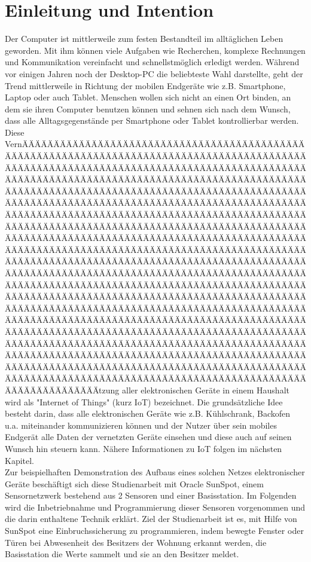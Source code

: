 ﻿\chapter{Einleitung und Intention}\label{c:Einleitung} %

Der Computer ist mittlerweile zum festen Bestandteil im alltäglichen Leben geworden. Mit ihm können viele Aufgaben wie Recherchen, komplexe Rechnungen und Kommunikation vereinfacht und schnellstmöglich erledigt werden. Während vor einigen Jahren noch der Desktop-PC die beliebteste Wahl darstellte, geht der Trend mittlerweile in Richtung der mobilen Endgeräte wie z.B. Smartphone, Laptop oder auch Tablet. Menschen wollen sich nicht an einen Ort binden, an dem sie ihren Computer benutzen können und sehnen sich nach dem Wunsch, dass alle Alltagsgegenstände per Smartphone oder Tablet kontrollierbar werden.\\

Diese VernÄÄÄÄÄÄÄÄÄÄÄÄÄÄÄÄÄÄÄÄÄÄÄÄÄÄÄÄÄÄÄÄÄÄÄÄÄÄÄÄÄÄÄÄÄÄÄÄÄÄÄÄÄÄÄÄÄÄÄÄÄÄÄÄÄÄÄÄÄÄÄÄÄÄÄÄÄÄÄÄÄÄÄÄÄÄÄÄÄÄÄÄÄÄÄÄÄÄÄÄÄÄÄÄÄÄÄÄÄÄÄÄÄÄÄÄÄÄÄÄÄÄÄÄÄÄÄÄÄÄÄÄÄÄÄÄÄÄÄÄÄÄÄÄÄÄÄÄÄÄÄÄÄÄÄÄÄÄÄÄÄÄÄÄÄÄÄÄÄÄÄÄÄÄÄÄÄÄÄÄÄÄÄÄÄÄÄÄÄÄÄÄÄÄÄÄÄÄÄÄÄÄÄÄÄÄÄÄÄÄÄÄÄÄÄÄÄÄÄÄÄÄÄÄÄÄÄÄÄÄÄÄÄÄÄÄÄÄÄÄÄÄÄÄÄÄÄÄÄÄÄÄÄÄÄÄÄÄÄÄÄÄÄÄÄÄÄÄÄÄÄÄÄÄÄÄÄÄÄÄÄÄÄÄÄÄÄÄÄÄÄÄÄÄÄÄÄÄÄÄÄÄÄÄÄÄÄÄÄÄÄÄÄÄÄÄÄÄÄÄÄÄÄÄÄÄÄÄÄÄÄÄÄÄÄÄÄÄÄÄÄÄÄÄÄÄÄÄÄÄÄÄÄÄÄÄÄÄÄÄÄÄÄÄÄÄÄÄÄÄÄÄÄÄÄÄÄÄÄÄÄÄÄÄÄÄÄÄÄÄÄÄÄÄÄÄÄÄÄÄÄÄÄÄÄÄÄÄÄÄÄÄÄÄÄÄÄÄÄÄÄÄÄÄÄÄÄÄÄÄÄÄÄÄÄÄÄÄÄÄÄÄÄÄÄÄÄÄÄÄÄÄÄÄÄÄÄÄÄÄÄÄÄÄÄÄÄÄÄÄÄÄÄÄÄÄÄÄÄÄÄÄÄÄÄÄÄÄÄÄÄÄÄÄÄÄÄÄÄÄÄÄÄÄÄÄÄÄÄÄÄÄÄÄÄÄÄÄÄÄÄÄÄÄÄÄÄÄÄÄÄÄÄÄÄÄÄÄÄÄÄÄÄÄÄÄÄÄÄÄÄÄÄÄÄÄÄÄÄÄÄÄÄÄÄÄÄÄÄÄÄÄÄÄÄÄÄÄÄÄÄÄÄÄÄÄÄÄÄÄÄÄÄÄÄÄÄÄÄÄÄÄÄÄÄÄÄÄÄÄÄÄÄÄÄÄÄÄÄÄÄÄÄÄÄÄÄÄÄÄÄÄÄÄÄÄÄÄÄÄÄÄÄÄÄÄÄÄÄÄÄÄÄÄÄÄÄÄÄÄÄÄÄÄÄÄÄÄÄÄÄÄÄÄÄÄÄÄÄÄÄÄÄÄÄÄÄÄÄÄÄÄÄÄÄÄÄÄÄÄÄÄÄÄÄÄÄÄÄÄÄÄÄÄÄÄÄÄÄÄÄÄÄÄÄÄÄÄÄÄÄÄÄÄÄÄÄÄÄÄÄÄÄÄÄÄÄÄÄÄÄÄÄÄÄÄÄÄÄÄÄÄÄÄÄÄÄÄÄÄÄÄÄÄÄÄÄÄÄÄÄÄÄÄÄÄÄÄÄÄÄÄÄÄÄÄÄÄÄÄÄÄÄÄÄÄÄÄÄÄÄÄÄÄÄÄÄÄÄÄÄÄÄÄÄÄÄÄÄÄÄÄÄÄÄÄÄÄÄÄÄÄÄÄÄÄÄÄÄÄÄÄÄÄÄÄÄÄÄÄÄÄÄÄÄÄÄÄÄÄÄÄÄÄÄÄÄÄÄÄÄÄÄÄÄÄÄÄÄÄÄÄÄÄÄÄÄÄÄÄÄÄÄÄÄÄÄÄÄÄÄÄÄÄÄÄÄÄÄÄÄÄÄÄÄÄÄÄÄÄÄÄÄÄÄÄÄÄÄÄÄÄÄÄÄÄÄÄÄÄÄÄÄÄÄÄÄÄÄÄÄÄÄÄÄÄÄÄÄÄÄÄÄÄÄÄÄÄÄÄÄÄÄÄÄÄÄÄÄÄÄÄÄÄÄÄÄÄÄÄÄÄÄÄÄÄÄÄÄÄÄÄÄÄÄÄÄÄÄÄtzung aller elektronischen Geräte in einem Haushalt wird als "Internet of Things" (kurz IoT) bezeichnet. Die grundsätzliche Idee besteht darin, dass alle elektronischen Geräte wie z.B. Kühlschrank, Backofen u.a. miteinander kommunizieren können und der Nutzer über sein mobiles Endgerät alle Daten der vernetzten Geräte einsehen und diese auch auf seinen Wunsch hin steuern kann. Nähere Informationen zu IoT folgen im nächsten Kapitel.\\

Zur beispielhaften Demonstration des Aufbaus eines solchen Netzes elektronischer Geräte beschäftigt sich diese Studienarbeit mit Oracle SunSpot, einem Sensornetzwerk bestehend aus 2 Sensoren und einer Basisstation. Im Folgenden wird die Inbetriebnahme und Programmierung dieser Sensoren vorgenommen und die darin enthaltene Technik erklärt. Ziel der Studienarbeit ist es, mit Hilfe von SunSpot eine Einbruchssicherung zu programmieren, indem bewegte Fenster oder Türen bei Abwesenheit des Besitzers der Wohnung erkannt werden, die Basisstation die Werte sammelt und sie an den Besitzer meldet.